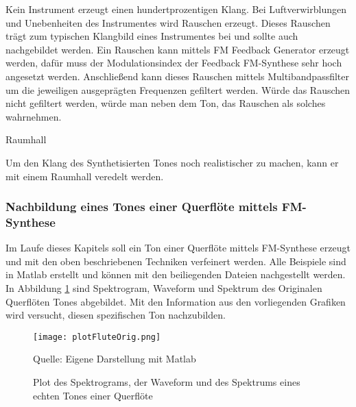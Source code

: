 Kein Instrument erzeugt einen hundertprozentigen Klang. Bei Luftverwirblungen und Unebenheiten des Instrumentes wird Rauschen erzeugt. Dieses Rauschen trägt zum typischen Klangbild eines Instrumentes bei und sollte auch nachgebildet werden. Ein Rauschen kann mittels FM Feedback Generator erzeugt werden, dafür muss der Modulationsindex der Feedback FM-Synthese sehr hoch angesetzt werden. Anschließend kann dieses Rauschen mittels Multibandpassfilter um die jeweiligen ausgeprägten Frequenzen gefiltert werden. Würde das Rauschen nicht gefiltert werden, würde man neben dem Ton, das Rauschen als solches wahrnehmen.

Raumhall

Um den Klang des Synthetisierten Tones noch realistischer zu machen, kann er mit einem Raumhall veredelt werden.


\FloatBarrier
\subsubsection{Nachbildung eines Tones einer Querflöte mittels FM-Synthese}

Im Laufe dieses Kapitels soll ein Ton einer Querflöte mittels FM-Synthese erzeugt und mit den oben beschriebenen Techniken verfeinert werden. Alle Beispiele sind in Matlab erstellt und können mit den beiliegenden Dateien nachgestellt werden. In Abbildung \ref{fig:plotFluteOrig} sind Spektrogram, Waveform und Spektrum des Originalen Querflöten Tones abgebildet. Mit den Information aus den vorliegenden Grafiken wird versucht, diesen spezifischen Ton nachzubilden.

\begin{figure} [ht]
\centering
  \texttt{[image: plotFluteOrig.png]}
\caption{Plot des Spektrograms, der Waveform und des Spektrums eines echten Tones einer Querflöte}
\label{fig:plotFluteOrig}
Quelle: Eigene Darstellung mit Matlab
\end{figure}

